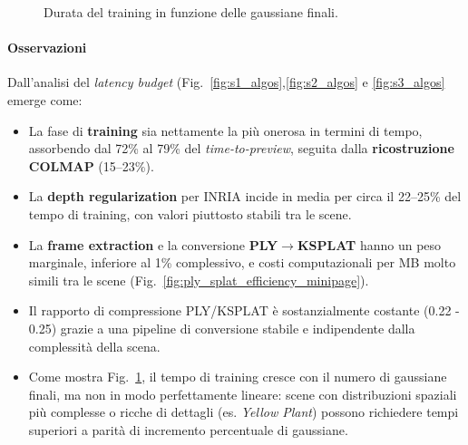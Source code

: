 \begin{figure}[H]
	\centering
	\caption{Durata del training in funzione delle gaussiane finali.}
	\label{fig:train_vs_gauss}
\end{figure}


\paragraph{Osservazioni}
Dall’analisi del \emph{latency budget} (Fig.~\ref{fig:s1_algos},\ref{fig:s2_algos} e \ref{fig:s3_algos} emerge come:
\begin{itemize}
	\item La fase di \textbf{training} sia nettamente la più onerosa in termini di tempo, assorbendo dal 72\% al 79\% del \emph{time-to-preview}, seguita dalla \textbf{ricostruzione COLMAP} (15–23\%).
	\item La \textbf{depth regularization} per INRIA incide in media per circa il 22–25\% del tempo di training, con valori piuttosto stabili tra le scene.
	\item La \textbf{frame extraction} e la conversione \textbf{PLY$\rightarrow$KSPLAT} hanno un peso marginale, inferiore al 1\% complessivo, e costi computazionali per MB molto simili tra le scene (Fig.~\ref{fig:ply_splat_efficiency_minipage}).
	\item Il rapporto di compressione PLY/KSPLAT è sostanzialmente costante (0.22 - 0.25) grazie a una pipeline di conversione stabile e indipendente dalla complessità della scena.
	\item Come mostra Fig.~\ref{fig:train_vs_gauss}, il tempo di training cresce con il numero di gaussiane finali, ma non in modo perfettamente lineare: scene con distribuzioni spaziali più complesse o ricche di dettagli (es. \emph{Yellow Plant}) possono richiedere tempi superiori a parità di incremento percentuale di gaussiane.
\end{itemize}

